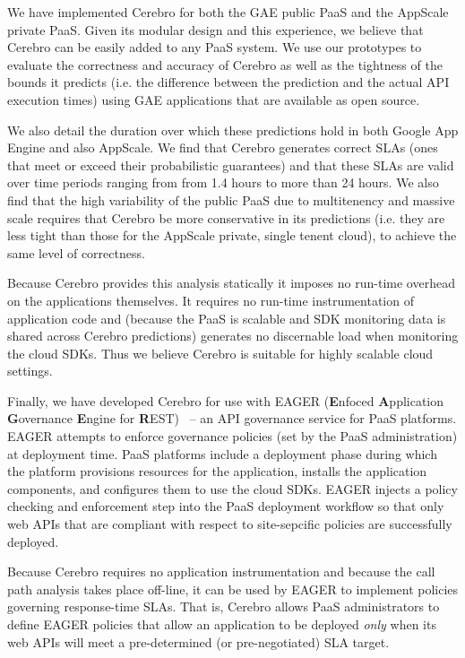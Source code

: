 We have implemented Cerebro for both the GAE public PaaS and 
the AppScale private PaaS. Given its modular design and this experience, 
we believe that Cerebro can be easily added to any PaaS system.
We use our prototypes to evaluate the correctness and accuracy of Cerebro 
as well as the tightness
of the bounds it predicts (i.e. the difference between the prediction and 
the actual API execution times) using GAE applications
that are available
as open source.  

We also detail the duration over which 
these predictions hold in both Google App Engine and also AppScale.  
We find that Cerebro generates correct SLAs (ones that meet or exceed their
probabilistic guarantees) and that these SLAs are valid over time periods ranging from
from 1.4 hours to more than 24 hours.  
We also find that the high variability of the public PaaS due to multitenency
and massive scale requires that Cerebro be more conservative in its predictions
(i.e. they are less tight than those for the AppScale private, single tenent cloud), 
to achieve the same level of correctness.  

Because Cerebro provides this 
analysis statically it imposes no run-time overhead on the applications
themselves.  It requires no run-time instrumentation of application code and
(because the PaaS is scalable and SDK monitoring data is shared across Cerebro
predictions) generates no discernable load when monitoring
the cloud SDKs.  Thus we believe Cerebro is suitable for highly scalable cloud
settings.

Finally, we have developed Cerebro for use with EAGER (\textbf{E}nfoced
\textbf{A}pplication \textbf{G}overnance \textbf{E}ngine for
\textbf{R}EST)~\cite{XXXeagerXXX} --
an API governance service for PaaS platforms.  EAGER attempts to enforce
governance policies (set by the PaaS administration) at deployment time.  PaaS
platforms include a deployment phase during which the platform provisions
resources for the application, installs the application components, and
configures them to use the cloud SDKs.  EAGER injects a policy checking and
enforcement step into the PaaS deployment workflow so that only web APIs that
are compliant with respect to site-sepcific policies are successfully deployed. 

Because Cerebro requires no application instrumentation and because the call
path analysis takes place off-line, it can be used by EAGER to implement
policies governing response-time SLAs.  That is, Cerebro allows
PaaS administrators to define
EAGER policies that allow an application to be deployed \textit{only} when its
web APIs will meet a pre-determined (or pre-negotiated) SLA target.

